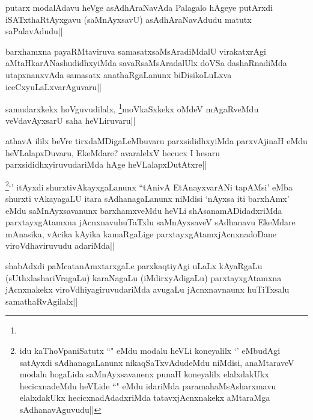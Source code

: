 \begin{artha}
putarx modalAdavu heVge asAdhAraNavAda Palagalo hAgeye putArxdi iSATxthaRtAyxgavu (saMnAyxsavU) asAdhAraNavAdudu matutx saPalavAdudu||
\end{artha}

\begin{artha}
barxhamxna payaRMtaviruva samasatxsaMsAradiMdalU virakatxrAgi aMtaHkarANashudidhxyiMda savaRsaMsAradalUlx doVSa dashaRnadiMda utapxnanxvAda samasatx anathaRgaLanunx biDisikoLuLxva iceCxyuLaLxvarAguvaru||
\end{artha}


\begin{artha}
samudarxkekx hoVguvudilalx, \footnote{}moVkaSxkekx oMdeV mAgaRveMdu veVdavAyxsarU saha heVLiruvaru|| 
\end{artha}


\begin{artha}
athavA ililx beVre tirxdaMDigaLeMbuvaru parxsididhxyiMda parxvAjinaH eMdu heVLalapxDuvaru, EkeMdare? avaralelxV hecucx I hesaru parxsididhxyiruvudariMda hAge heVLalapxDutAtxre||
\end{artha}


\begin{artha}
\footnote{\stext \stext idu kaThoVpaniSatutx ``\stext" eMdu modalu heVLi koneyalilx `\stext' eMbudAgi satAyxdi sAdhanagaLanunx nikaqSaTxvAdudeMdu niMdisi, anaMtaraveV modalu hogaLida saMnAyxsavanenx punaH koneyalilx elalxdakUkx hecicxnadeMdu heVLide ``\stext" eMdu idariMda paramahaMsAsharxmavu elalxdakUkx hecicxnadAdadxriMda tatavxjAcnxnakekx aMtaraMga sAdhanavAguvudu||}`\stext' itAyxdi shurxtivAkayxgaLanunx ``tAnivA EtAnayxvarANi tapAMsi' eMba shurxti vAkayagaLU itara sAdhanagaLanunx niMdisi `nAyxsa iti barxhAmx' eMdu saMnAyxsavanunx barxhamxveMdu heVLi shAsanamADidadxriMda parxtayxgAtamxna jAcnxnavuhuTaTxlu saMnAyxsaveV sAdhanavu EkeMdare mAnasika, vAcika kAyika kamaRgaLige parxtayxgAtamxjAcnxnadoDane viroVdhaviruvudu adariMda||
\end{artha}


\begin{artha}
shabAdxdi paMcatanAmxtarxgaLe parxkaqtiyAgi uLaLx kAyaRgaLu (sUthxlashariVragaLu) karaNagaLu (iMdirxyAdigaLu) parxtayxgAtamxna jAcnxnakekx viroVdhiyagiruvudariMda avugaLu jAcnxnavnaunx huTiTxsalu samathaRvAgilalx||
\end{artha}

